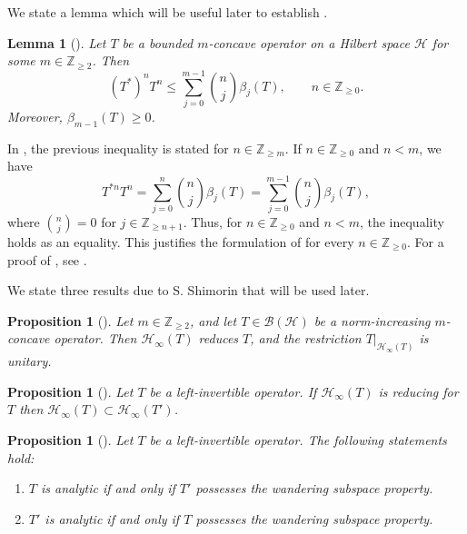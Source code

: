 \documentclass[11pt, reqno, a4paper]{amsart}
\newtheorem{lemma}[theorem]{Lemma}
\newtheorem{proposition}[theorem]{Proposition}
\theoremstyle{definition}
\newcommand{\calB}{{\mathcal{B}}}
\newcommand{\calH}{{\mathcal{H}}}
\renewcommand{\le}{\leqslant}
\renewcommand{\ge}{\geqslant}
\newcommand{\Z}{\mathbb Z}
\numberwithin{equation}{section}
\begin{document}
We state a lemma which will be useful later to establish .

\begin{lemma}[{\cite[Lemma 5.1]{MR4534903}}]
    Let $T$ be a bounded $m$-concave operator on a Hilbert space $\calH$ for some $m \in \Z_{\ge 2}$. Then 
    \begin{equation*}
        (T^{*})^{n} T^{n} \le \sum_{j =0}^{m-1} \binom{n}{j} \beta_j (T), \qquad n \in \Z_{\ge 0}.
    \end{equation*}
    Moreover, $\beta_{m-1} (T) \ge 0$.
    \label{lem:m-concave}
\end{lemma}

    In \cite[Lemma 5.1]{MR4534903}, the previous inequality is stated for $n \in \Z_{\ge m}$. If $n \in \Z_{\ge 0}$ and $n < m$, we have
        \begin{equation*}  
            T^{*n}T^n = \sum_{j=0}^{n}\binom nj\beta_j(T) = \sum_{j=0}^{m-1}\binom nj\beta_j(T), 
        \end{equation*} 
    where $\binom{n}{j}=0$ for $j \in \Z_{\ge n+1}$. Thus, for $n \in \Z_{\ge 0}$ and $n < m$, the inequality holds as an equality. This justifies the formulation of  for every $n\in\Z_{\ge 0}$. For a proof of , see \cite[Theorem 2.5 and Corollary 2.4]{MR3314868}.

    We state three results due to S. Shimorin that will be used later.

    \begin{proposition}[{\cite[Proposition~3.4]{zbMATH01572594}}]
    Let $m \in \Z_{\ge 2}$, and let $T\in\calB(\calH)$ be a norm-increasing $m$-concave operator. Then $\calH_\infty(T)$ reduces $T$, and the restriction $T|_{\calH_\infty(T)}$ is unitary.
    \label{prop:Shimorin-hyper-range}
    \end{proposition}

    \begin{proposition}[{\cite[Proposition 2.10]{zbMATH01572594}}]
        Let $T$ be a left-invertible operator. If $\calH_{\infty} (T)$ is reducing for $T$ then $\calH_{\infty} (T) \subset \calH_{\infty} (T')$.
        \label{prop:hyperange-T-subset-hyperange-T'}
    \end{proposition}

    \begin{proposition}[{\cite[Corollary 2.8]{zbMATH01572594}}] 
    \label{prop:analytic-wsp-in-terms-of-cauchy-dual}
    Let $T$ be a left-invertible operator. The following statements hold:
    \begin{enumerate}
        \item[\rm (i)] $T$ is analytic if and only if $T'$ possesses the wandering subspace property.
        \item[\rm (ii)] $T'$ is analytic if and only if $T$ possesses the wandering subspace property.
    \end{enumerate}
    \end{proposition}
    
\end{document}
